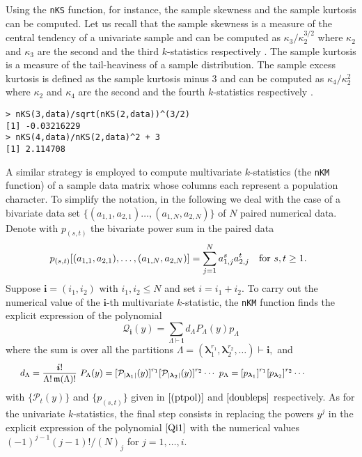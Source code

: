 Using the \texttt{nKS} function, for instance, the sample skewness and
the sample kurtosis can be computed. Let us recall that the sample
skewness is a measure of the central tendency of a univariate sample and
can be computed as \(\kappa_3/\kappa_2^{3/2}\) where \(\kappa_2\) and
\(\kappa_3\) are the second and the third \(k\)-statistics respectively
\citep{joanes1998comparing}. The sample kurtosis is a measure of the
tail-heaviness of a sample distribution. The sample excess kurtosis is
defined as the sample kurtosis minus 3 and can be computed as
\(\kappa_4/\kappa_2^{2}\) where \(\kappa_2\) and \(\kappa_4\) are the
second and the fourth \(k\)-statistics respectively
\citep{joanes1998comparing}.

\begin{verbatim}
> nKS(3,data)/sqrt(nKS(2,data))^(3/2)
[1] -0.03216229
> nKS(4,data)/nKS(2,data)^2 + 3
[1] 2.114708
\end{verbatim}

A similar strategy is employed to compute multivariate \(k\)-statistics
(the \texttt{nKM} function) of a sample data matrix whose columns each
represent a population character. To simplify the notation, in the
following we deal with the case of a bivariate data set
\(\{(a_{1,1},a_{2,1}) \ldots, (a_{1,N},a_{2,N})\}\) of \(N\) paired
numerical data. Denote with \(p_{(s,t)}\) the bivariate power sum in the
paired data \begin{equation}
\!\!\!p_{(s,t)}[(a_{1,1},a_{2,1}), \ldots, (a_{1,N},a_{2,N})] = \sum_{j=1}^N a^s_{1,j} a^t_{2,j}
\quad \hbox{for} \,\, s,t \geq 1.
\label{doubleps}
\end{equation} Suppose \(\boldsymbol{i}=(i_1, i_2)\) with
\(i_1, i_2 \leq N\) and set \(i=i_1+i_2.\) To carry out the numerical
value of the \(\boldsymbol{i}\)-th multivariate \(k\)-statistic, the
\texttt{nKM} function finds the explicit expression of the polynomial
\begin{equation}
{\mathcal Q}_{\boldsymbol{i}}(y) =  \sum_{\Lambda \vdash \boldsymbol{i}} d_{\Lambda}  P_{\Lambda}(y)
p_{\Lambda}
\label{Qi1}
\end{equation} where the sum is over all the partitions
\(\Lambda=(\boldsymbol{\lambda}_1^{r_1}, \boldsymbol{\lambda}_2^{r_2},\ldots) \vdash \boldsymbol{i},\)
and \begin{equation}
\hskip-1.5cm{\small d_{\Lambda} = \frac{\boldsymbol{i}!}{\Lambda! \, \mathfrak{m}(\Lambda)!} \,\, 
P_{\Lambda}(y)  = 
  [{\mathcal P}_{|\boldsymbol{\lambda}_1|}(y)]^{r_1}  [{\mathcal P}_{|\boldsymbol{\lambda}_2|}(y)]^{r_2} \cdots \,\, p_{\Lambda} = 
[p_{\boldsymbol{\lambda}_1}]^{r_1} [p_{\boldsymbol{\lambda}_2}]^{r_2}  \cdots
\label{dlm}}\!\!\!
\end{equation} with \(\{{\mathcal P}_{t}(y)\}\) and \(\{p_{(s,t)}\}\)
given in \(\eqref{(ptpol)}\) and \(\eqref{doubleps}\) respectively. As
for the univariate \(k\)-statistics, the final step consists in
replacing the powers \(y^j\) in the explicit expression of the
polynomial \(\eqref{Qi1}\) with the numerical values
\((-1)^{j-1} (j-1)!/(N)_j\) for \(j=1, \ldots,i.\)

